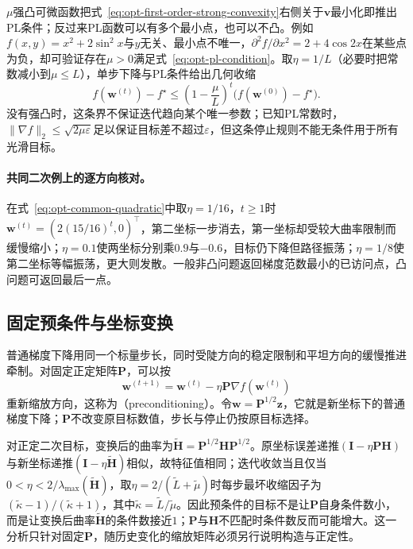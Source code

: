 $\mu$强凸可微函数把式~\eqref{eq:opt-first-order-strong-convexity}右侧关于$\bm v$最小化即推出PL条件；反过来PL函数可以有多个最小点，也可以不凸。例如$f(x,y)=x^2+2\sin^2x$与$y$无关、最小点不唯一，$\partial^2 f/\partial x^2=2+4\cos2x$在某些点为负，却可验证存在$\mu>0$满足式~\eqref{eq:opt-pl-condition}。取$\eta=1/L$（必要时把常数减小到$\mu\leq L$），单步下降与PL条件给出几何收缩
\begin{equation}
  f(\bm{w}^{(t)})-f^\star
  \leq\left(1-\frac{\mu}{L}\right)^t
  \bigl(f(\bm{w}^{(0)})-f^\star\bigr).
  \label{eq:opt-pl-linear-rate}
\end{equation}
没有强凸时，这条界不保证迭代趋向某个唯一参数；已知PL常数时，$\|\nabla f\|_2\leq\sqrt{2\mu\varepsilon}$足以保证目标差不超过$\varepsilon$，但这条停止规则不能无条件用于所有光滑目标。

\paragraph{共同二次例上的逐方向核对。}
在式~\eqref{eq:opt-common-quadratic}中取$\eta=1/16$，$t\geq1$时$\bm w^{(t)}=(2(15/16)^t,0)^\top$，第二坐标一步消去，第一坐标却受较大曲率限制而缓慢缩小；$\eta=0.1$使两坐标分别乘$0.9$与$-0.6$，目标仍下降但路径振荡；$\eta=1/8$使第二坐标等幅振荡，更大则发散。一般非凸问题返回梯度范数最小的已访问点，凸问题可返回最后一点。

\subsection{固定预条件与坐标变换}

普通梯度下降用同一个标量步长，同时受陡方向的稳定限制和平坦方向的缓慢推进牵制。对固定正定矩阵$\bm P$，可以按
\begin{equation}
  \bm{w}^{(t+1)}=\bm{w}^{(t)}-\eta\bm P\nabla f(\bm{w}^{(t)})
  \label{eq:opt-fixed-precondition}
\end{equation}
重新缩放方向，这称为（preconditioning）。令$\bm w=\bm P^{1/2}\bm z$，它就是新坐标下的普通梯度下降；$\bm P$不改变原目标数值，步长与停止仍按原目标选择。

对正定二次目标，变换后的曲率为$\widetilde{\bm H}=\bm P^{1/2}\bm H\bm P^{1/2}$。原坐标误差递推$(\bm I-\eta\bm P\bm H)$与新坐标递推$(\bm I-\eta\widetilde{\bm H})$相似，故特征值相同；迭代收敛当且仅当$0<\eta<2/\lambda_{\max}(\widetilde{\bm H})$，取$\eta=2/(\widetilde L+\widetilde\mu)$时每步最坏收缩因子为$(\widetilde\kappa-1)/(\widetilde\kappa+1)$，其中$\widetilde\kappa=\widetilde L/\widetilde\mu$。因此预条件的目标不是让$\bm P$自身条件数小，而是让变换后曲率$\widetilde{\bm H}$的条件数接近$1$；$\bm P$与$\bm H$不匹配时条件数反而可能增大。这一分析只针对固定$\bm P$，随历史变化的缩放矩阵必须另行说明构造与正定性。

